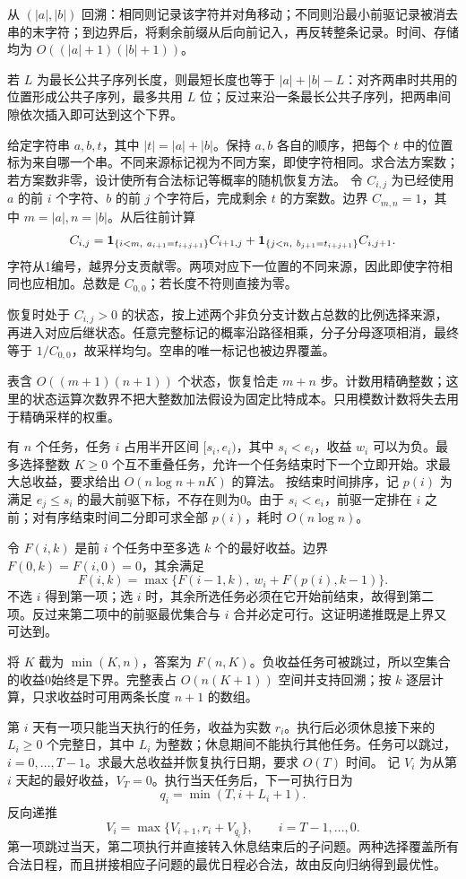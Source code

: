 从 $(|a|,|b|)$ 回溯：相同则记录该字符并对角移动；不同则沿最小前驱记录被消去串的末字符；到边界后，将剩余前缀从后向前记入，再反转整条记录。时间、存储均为 $O((|a|+1)(|b|+1))$。

若 $L$ 为最长公共子序列长度，则最短长度也等于 $|a|+|b|-L$：对齐两串时共用的位置形成公共子序列，最多共用 $L$ 位；反过来沿一条最长公共子序列，把两串间隙依次插入即可达到这个下界。

给定字符串 $a,b,t$，其中 $|t|=|a|+|b|$。保持 $a,b$ 各自的顺序，把每个 $t$ 中的位置标为来自哪一个串。不同来源标记视为不同方案，即使字符相同。求合法方案数；若方案数非零，设计使所有合法标记等概率的随机恢复方法。
\solution 令 $C_{i,j}$ 为已经使用 $a$ 的前 $i$ 个字符、$b$ 的前 $j$ 个字符后，完成剩余 $t$ 的方案数。边界 $C_{m,n}=1$，其中 $m=|a|,n=|b|$。从后往前计算
\[
C_{i,j}=\ind_{\{i<m,\ a_{i+1}=t_{i+j+1}\}}C_{i+1,j}
       +\ind_{\{j<n,\ b_{j+1}=t_{i+j+1}\}}C_{i,j+1}.
\]
字符从1编号，越界分支贡献零。两项对应下一位置的不同来源，因此即使字符相同也应相加。总数是 $C_{0,0}$；若长度不符则直接为零。

恢复时处于 $C_{i,j}>0$ 的状态，按上述两个非负分支计数占总数的比例选择来源，再进入对应后继状态。任意完整标记的概率沿路径相乘，分子分母逐项相消，最终等于 $1/C_{0,0}$，故采样均匀。空串的唯一标记也被边界覆盖。

表含 $O((m+1)(n+1))$ 个状态，恢复恰走 $m+n$ 步。计数用精确整数；这里的状态运算次数界不把大整数加法假设为固定比特成本。只用模数计数将失去用于精确采样的权重。

有 $n$ 个任务，任务 $i$ 占用半开区间 $[s_i,e_i)$，其中 $s_i<e_i$，收益 $w_i$ 可以为负。最多选择整数 $K\ge0$ 个互不重叠任务，允许一个任务结束时下一个立即开始。求最大总收益，要求给出 $O(n\log n+nK)$ 的算法。
\solution 按结束时间排序，记 $p(i)$ 为满足 $e_j\le s_i$ 的最大前驱下标，不存在则为0。由于 $s_i<e_i$，前驱一定排在 $i$ 之前；对有序结束时间二分即可求全部 $p(i)$，耗时 $O(n\log n)$。

令 $F(i,k)$ 是前 $i$ 个任务中至多选 $k$ 个的最好收益。边界 $F(0,k)=F(i,0)=0$，其余满足
\[
F(i,k)=\max\{F(i-1,k),\ w_i+F(p(i),k-1)\}.
\]
不选 $i$ 得到第一项；选 $i$ 时，其余所选任务必须在它开始前结束，故得到第二项。反过来第二项中的前驱最优集合与 $i$ 合并必定可行。这证明递推既是上界又可达到。

将 $K$ 截为 $\min(K,n)$，答案为 $F(n,K)$。负收益任务可被跳过，所以空集合的收益0始终是下界。完整表占 $O(n(K+1))$ 空间并支持回溯；按 $k$ 逐层计算，只求收益时可用两条长度 $n+1$ 的数组。

第 $i$ 天有一项只能当天执行的任务，收益为实数 $r_i$。执行后必须休息接下来的 $L_i\ge0$ 个完整日，其中 $L_i$ 为整数；休息期间不能执行其他任务。任务可以跳过，$i=0,\ldots,T-1$。求最大总收益并恢复执行日期，要求 $O(T)$ 时间。
\solution 记 $V_i$ 为从第 $i$ 天起的最好收益，$V_T=0$。执行当天任务后，下一可执行日为
\[
q_i=\min(T,i+L_i+1).
\]
反向递推
\[
V_i=\max\{V_{i+1},r_i+V_{q_i}\},\qquad i=T-1,\ldots,0.
\]
第一项跳过当天，第二项执行并直接转入休息结束后的子问题。两种选择覆盖所有合法日程，而且拼接相应子问题的最优日程必合法，故由反向归纳得到最优性。

